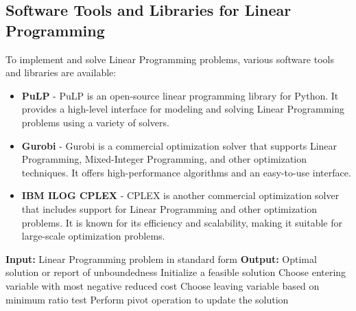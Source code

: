 \documentclass[12pt]{book} %
\begin{document}
\subsection{Software Tools and Libraries for Linear Programming}
To implement and solve Linear Programming problems, various software tools and libraries are available:

\begin{itemize}
    \item \textbf{PuLP} - PuLP is an open-source linear programming library for Python. It provides a high-level interface for modeling and solving Linear Programming problems using a variety of solvers.
    \item \textbf{Gurobi} - Gurobi is a commercial optimization solver that supports Linear Programming, Mixed-Integer Programming, and other optimization techniques. It offers high-performance algorithms and an easy-to-use interface.
    \item \textbf{IBM ILOG CPLEX} - CPLEX is another commercial optimization solver that includes support for Linear Programming and other optimization problems. It is known for its efficiency and scalability, making it suitable for large-scale optimization problems.
\end{itemize}

\FloatBarrier
\begin{algorithm}
\caption{Simplex Method}\label{simplex}
\begin{algorithmic}[1]
\State \textbf{Input:} Linear Programming problem in standard form
\State \textbf{Output:} Optimal solution or report of unboundedness
\State Initialize a feasible solution
\State Choose entering variable with most negative reduced cost
\State Choose leaving variable based on minimum ratio test
\State Perform pivot operation to update the solution
\EndWhile
\end{algorithmic}
\end{algorithm}
\FloatBarrier
\end{document}
